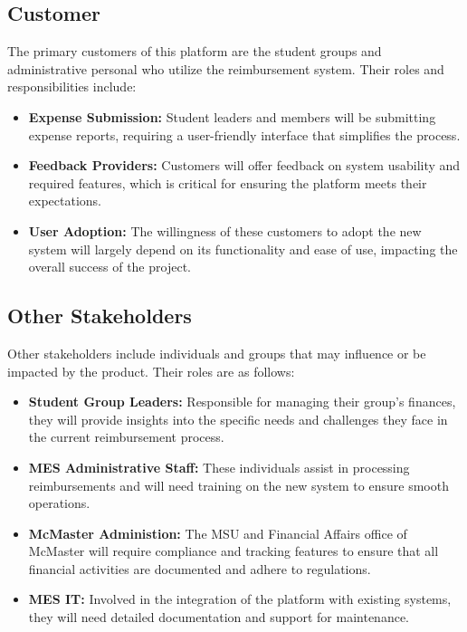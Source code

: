 \documentclass[12pt]{article}
\begin{document}
\subsection{Customer}
The primary customers of this platform are the student groups and administrative personal who utilize the reimbursement system. Their roles and responsibilities include:
\begin{itemize}
    \item \textbf{Expense Submission:} Student leaders and members will be submitting expense reports, requiring a user-friendly interface that simplifies the process.
    \item \textbf{Feedback Providers:} Customers will offer feedback on system usability and required features, which is critical for ensuring the platform meets their expectations.
    \item \textbf{User Adoption:} The willingness of these customers to adopt the new system will largely depend on its functionality and ease of use, impacting the overall success of the project.
\end{itemize}

\subsection{Other Stakeholders}
Other stakeholders include individuals and groups that may influence or be impacted by the product. Their roles are as follows:
\begin{itemize}
    \item \textbf{Student Group Leaders:} Responsible for managing their group's finances, they will provide insights into the specific needs and challenges they face in the current reimbursement process.
    \item \textbf{MES Administrative Staff:} These individuals assist in processing reimbursements and will need training on the new system to ensure smooth operations.
    \item \textbf{McMaster Administion:} The MSU and Financial Affairs office of McMaster will require compliance and tracking features to ensure that all financial activities are documented and adhere to regulations.
    \item \textbf{MES IT:} Involved in the integration of the platform with existing systems, they will need detailed documentation and support for maintenance.
\end{itemize}
\end{document}
